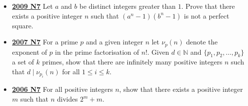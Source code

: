 \documentclass[11pt]{scrartcl}
\begin{document}
\begin{itemize}[leftmargin=*]
\item  \href{https://artofproblemsolving.com/community/c6h355801p1932947}{\textbf{2009 N7}} Let $a$ and $b$ be distinct integers greater than $1$. Prove that there exists a positive integer $n$ such that $(a^n-1)(b^n-1)$ is not a perfect square.
\item  \href{https://artofproblemsolving.com/community/c6h214654p1186847}{\textbf{2007 N7}} For a prime $ p$ and a given integer $ n$ let $ \nu_p(n)$ denote the exponent of $ p$ in the prime factorisation of $ n!$. Given $ d \in \mathbb{N}$ and $ \{p_1,p_2,\dots,p_k\}$ a set of $ k$ primes, show that there are infinitely many positive integers $ n$ such that $ d\mid \nu_{p_i}(n)$ for all $ 1 \leqslant i \leqslant k$.
\item  \href{https://artofproblemsolving.com/community/c6h154177p867486}{\textbf{2006 N7}} For all positive integers $n$, show that there exists a positive integer $m$ such that $n$ divides $2^{m} + m$.
\end{itemize}

\newpage
\end{document}
